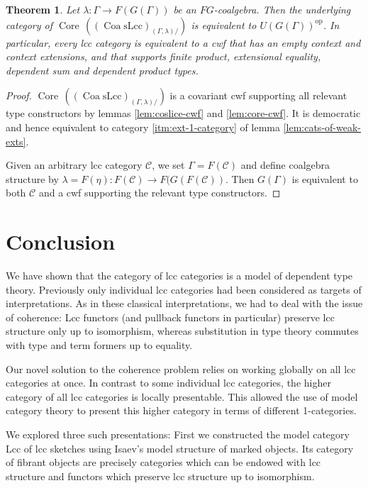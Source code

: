\documentclass[a4paper]{article}
\newtheorem{theorem}{Theorem}
\theoremstyle{remark}
\theoremstyle{definition}
\begin{document}
\begin{theorem}
  \label{th:context-as-model}
  Let $\lambda : \Gamma \rightarrow F(G(\Gamma))$ be an $FG$-coalgebra.
  Then the underlying category of $\operatorname{Core} \, ((\operatorname{Coa} \mathrm{sLcc})_{(\Gamma, \lambda) /})$ is equivalent to $U(G(\Gamma))^\mathrm{op}$.
  In particular, every lcc category is equivalent to a cwf that has an empty context and context extensions, and that supports finite product, extensional equality, dependent sum and dependent product types.
\end{theorem}
\begin{proof}
  $\operatorname{Core} \, ((\operatorname{Coa} \mathrm{sLcc})_{(\Gamma, \lambda) /})$ is a covariant cwf supporting all relevant type constructors by lemmas \ref{lem:coslice-cwf} and \ref{lem:core-cwf}.
  It is democratic and hence equivalent to category \ref{itm:ext-1-category} of lemma \ref{lem:cats-of-weak-exts}.

  Given an arbitrary lcc category $\mathcal{C}$, we set $\Gamma = F(\mathcal{C})$ and define coalgebra structure by $\lambda = F(\eta) : F(\mathcal{C}) \rightarrow F(G(F(\mathcal{C}))$.
  Then $G(\Gamma)$ is equivalent to both $\mathcal{C}$ and a cwf supporting the relevant type constructors.
\end{proof}

\section{Conclusion}

We have shown that the category of lcc categories is a model of dependent type theory.
Previously only individual lcc categories had been considered as targets of interpretations.
As in these classical interpretations, we had to deal with the issue of coherence:
Lcc functors (and pullback functors in particular) preserve lcc structure only up to isomorphism, whereas substitution in type theory commutes with type and term formers up to equality.

Our novel solution to the coherence problem relies on working globally on all lcc categories at once.
In contrast to some individual lcc categories, the higher category of all lcc categories is locally presentable.
This allowed the use of model category theory to present this higher category in terms of different 1-categories.

We explored three such presentations:
First we constructed the model category $\mathrm{Lcc}$ of lcc sketches using Isaev's model structure of marked objects.
Its category of fibrant objects are precisely categories which can be endowed with lcc structure and functors which preserve lcc structure up to isomorphism.
\end{document}
